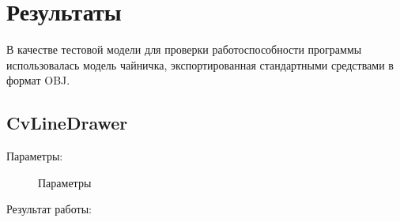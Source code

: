 \documentclass[14pt,a4paper,report]{report}
\begin{document}
\clearpage
\section{Результаты}
В качестве тестовой модели для проверки работоспособности программы использовалась модель чайничка, экспортированная стандартными средствами в формат OBJ.

 


\subsection{CvLineDrawer}
Параметры:

\begin{figure}[h!]
\caption{Параметры}
\label{ris:image}
\end{figure}

Результат работы: 
\end{document}
